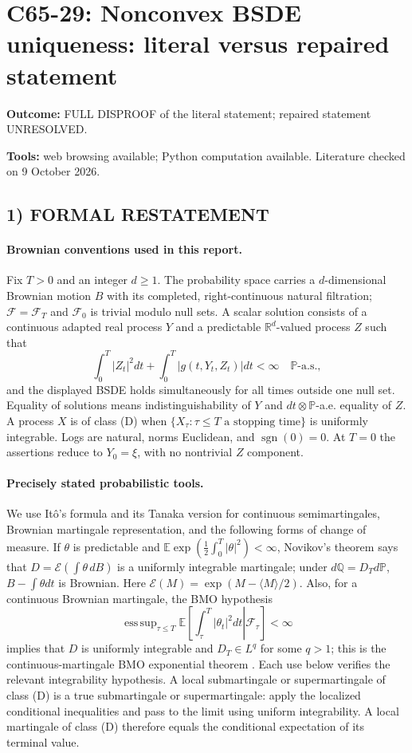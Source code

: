 \documentclass[11pt,a4paper]{article}
\newcommand{\R}{\mathbb R}
\newcommand{\E}{\mathbb E}
\newcommand{\Pp}{\mathbb P}
\newcommand{\Q}{\mathbb Q}
\newcommand{\F}{\mathcal F}
\newcommand{\cE}{\mathcal E}
\newcommand{\sgn}{\operatorname{sgn}}
\DeclareMathOperator*{\esssup}{ess\,sup}
\theoremstyle{definition}
\begin{document}
\section*{C65-29: Nonconvex BSDE uniqueness: literal versus repaired statement}
\textbf{Outcome:} FULL DISPROOF of the literal statement; repaired statement UNRESOLVED.\par\textbf{Tools:} web browsing available; Python computation available. Literature checked on 9 October 2026.
\subsection*{1) FORMAL RESTATEMENT}
\paragraph{Brownian conventions used in this report.}
Fix $T>0$ and an integer $d\ge1$. The probability space carries a $d$-dimensional Brownian motion $B$ with its completed, right-continuous natural filtration; $\F=\F_T$ and $\F_0$ is trivial modulo null sets. A scalar solution consists of a continuous adapted real process $Y$ and a predictable $\R^d$-valued process $Z$ such that
\[
 \int_0^T |Z_t|^2dt+\int_0^T|g(t,Y_t,Z_t)|dt<\infty\quad\Pp\text{-a.s.},
\]
and the displayed BSDE holds simultaneously for all times outside one null set. Equality of solutions means indistinguishability of $Y$ and $dt\otimes\Pp$-a.e. equality of $Z$. A process $X$ is of class (D) when $\{X_\tau:\tau\le T\text{ a stopping time}\}$ is uniformly integrable. Logs are natural, norms Euclidean, and $\sgn(0)=0$. At $T=0$ the assertions reduce to $Y_0=\xi$, with no nontrivial $Z$ component.

\paragraph{Precisely stated probabilistic tools.}
We use It\^o's formula and its Tanaka version for continuous semimartingales, Brownian martingale representation, and the following forms of change of measure. If $\theta$ is predictable and $\E\exp(\frac12\int_0^T|\theta|^2)<\infty$, Novikov's theorem says that
$D=\cE(\int\theta\,dB)$ is a uniformly integrable martingale; under $d\Q=D_Td\Pp$, $B-\int\theta dt$ is Brownian. Here $\cE(M)=\exp(M-\langle M\rangle/2)$. Also, for a continuous Brownian martingale, the BMO hypothesis
\[
 \esssup_{\tau\le T}\E\left[\left.\int_\tau^T|\theta_t|^2dt\right|\F_\tau\right]<\infty
\]
implies that $D$ is uniformly integrable and $D_T\in L^q$ for some $q>1$; this is the continuous-martingale BMO exponential theorem \cite{Kazamaki}. Each use below verifies the relevant integrability hypothesis. A local submartingale or supermartingale of class (D) is a true submartingale or supermartingale: apply the localized conditional inequalities and pass to the limit using uniform integrability. A local martingale of class (D) therefore equals the conditional expectation of its terminal value.
\end{document}
